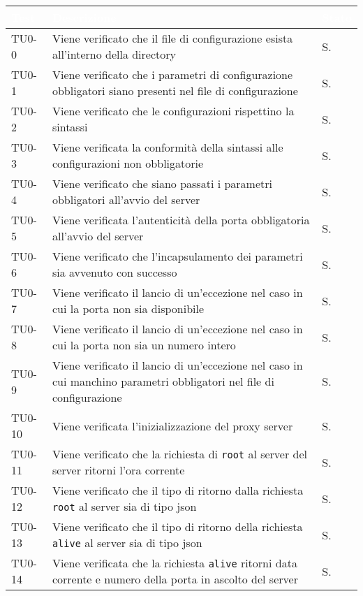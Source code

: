 \begin{longtable}{|C{.15\textwidth}|m{.65\textwidth}|C{.20\textwidth}|}
\hline
{}\textbf{\textcolor{white}{Test}}  & \textbf{\textcolor{white}{Descrizione}} & \textbf{\textcolor{white}{Stato}}\\
\hline \hline
\endhead

TU0-0 & Viene verificato che il file di configurazione esista all'interno della directory & S.\\
\hline 
{} TU0-1 & Viene verificato che i parametri di configurazione obbligatori siano presenti nel file di configurazione & S. \\ 
\hline
TU0-2 & Viene verificato che le configurazioni rispettino la sintassi & S. \\ 
\hline
{} TU0-3 & Viene verificata la conformità della sintassi alle configurazioni non obbligatorie & S. \\ 
\hline 
TU0-4 & Viene verificato che siano passati i parametri obbligatori all'avvio del server & S. \\ 
\hline
{} TU0-5 & Viene verificata l'autenticità della porta obbligatoria all'avvio del server & S. \\ 
\hline
TU0-6 & Viene verificato  che l'incapsulamento dei parametri sia avvenuto con successo & S. \\
\hline 
{} TU0-7 & Viene verificato il lancio di un'eccezione nel caso in cui la porta non sia disponibile & S. \\ 
\hline 
TU0-8 & Viene verificato il lancio di un'eccezione nel caso in cui la porta non sia un numero intero & S. \\
\hline
{}  TU0-9 & Viene verificato il lancio di un'eccezione nel caso in cui manchino parametri obbligatori nel file di configurazione & S. \\ 
\hline
TU0-10 & Viene verificata l'inizializzazione del proxy server & S. \\ 
\hline 
{} TU0-11 & Viene verificato che la richiesta di \texttt{root} al server del server ritorni l'ora corrente & S. \\ 
\hline
TU0-12 & Viene verificato che il tipo di ritorno dalla richiesta \texttt{root} al server sia di tipo json & S. \\ 
\hline 
{}TU0-13 & Viene verificato che il tipo di ritorno della richiesta \texttt{alive} al server sia di tipo json & S. \\ 
\hline
 TU0-14 & Viene verificata che la richiesta \texttt{alive} ritorni data corrente e numero della porta in ascolto del server & S. \\ 

\end{longtable}
